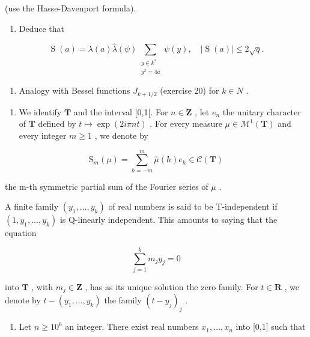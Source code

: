 (use the Hasse-Davenport formula).

\begin{enumerate}
\def\labelenumi{\alph{enumi})}
\setcounter{enumi}{1}
\tightlist
\item
  Deduce that
\end{enumerate}

\[
\operatorname{S}(a) = \lambda (a)\widehat{\lambda} (\psi)\sum_{\substack{y\in k^{*}\\ y^{2} = 4a}}\psi (y),\quad |\operatorname{S}(a)|\leqslant 2\sqrt{q}.
\]

\begin{enumerate}
\def\labelenumi{\alph{enumi})}
\setcounter{enumi}{2}
\tightlist
\item
  Analogy with Bessel functions \(J_{k+1/2}\) (exercise 20) for \(k \in N\) .
\end{enumerate}

\begin{enumerate}
\def\labelenumi{\arabic{enumi})}
\setcounter{enumi}{50}
\tightlist
\item
  We identify \(\mathbf{T}\) and the interval {[}0,1{[}. For \(n \in \mathbf{Z}\) , let \(e_n\) the unitary character of \(\mathbf{T}\) defined by \(t \mapsto \exp(2i\pi nt)\) . For every measure \(\mu \in \mathcal{M}^1(\mathbf{T})\) and every integer \(m \geqslant 1\) , we denote by
\end{enumerate}

\[
\mathrm{S} _ {m} (\mu) = \sum_ {h = - m} ^ {m} \widehat {\mu} (h) e _ {h} \in \mathcal {C} (\mathbf {T})
\]

the m-th symmetric partial sum of the Fourier series of \(\mu\) .

A finite family \((y_{1},\ldots,y_{k})\) of real numbers is said to be T-independent if \((1,y_{1},\ldots,y_{k})\) is Q-linearly independent. This amounts to saying that the equation

\[
\sum_ {j = 1} ^ {k} m _ {j} y _ {j} = 0
\]

into \(\mathbf{T}\) , with \(m_j \in \mathbf{Z}\) , has as its unique solution the zero family. For \(t \in \mathbf{R}\) , we denote by \(t - (y_1, \ldots, y_k)\) the family \((t - y_j)_j\) .

\begin{enumerate}
\def\labelenumi{\alph{enumi})}
\tightlist
\item
  Let \(n \geqslant 10^{6}\) an integer. There exist real numbers \(x_{1}, \ldots, x_{n}\) into {[}0,1{]} such that
\end{enumerate}

